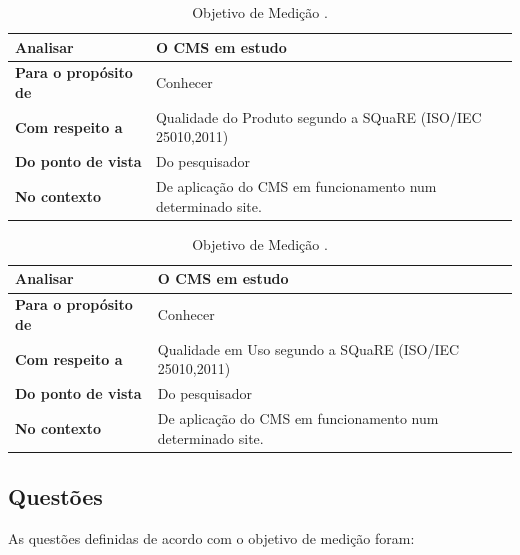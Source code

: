 \begin{longtable}{|p{160pt}|p{265pt}|}
 	\caption{Objetivo de Medição \cite{sollingen}.} \label{ObjMed}\\
 	\hline
 	 {\raggedright \textbf{Analisar}}
 	 & {\raggedright {O CMS em estudo}}\\
 	
 	\hline
 	 {\raggedright \textbf{Para o propósito de}}
 	 & {\raggedright   Conhecer }\\
 	
 	\hline
 	 {\raggedright \textbf{Com respeito a}}
 	 & {\raggedright Qualidade do Produto segundo a SQuaRE (ISO/IEC 25010,2011)}\\
 	
 	\hline
 	 {\raggedright \textbf{Do ponto de vista}} 
 	 & {\raggedright Do pesquisador 	                 } \\

 	\hline
 	 {\raggedright \textbf{No contexto}}
 	 & {\raggedright De aplicação do CMS em funcionamento num determinado site.} \\
 	\hline
\end{longtable}

\begin{longtable}{|p{160pt}|p{265pt}|}
 	\caption{Objetivo de Medição \cite{sollingen}.} \label{ObjMed-2}\\
 	\hline
 	 {\raggedright \textbf{Analisar}}
 	 & {\raggedright {O CMS em estudo}}\\
 	
 	\hline
 	 {\raggedright \textbf{Para o propósito de}}
 	 & {\raggedright   Conhecer }\\
 	
 	\hline
 	 {\raggedright \textbf{Com respeito a}}
 	 & {\raggedright Qualidade em Uso segundo a SQuaRE (ISO/IEC 25010,2011)}\\
 	
 	\hline
 	 {\raggedright \textbf{Do ponto de vista}} 
 	 & {\raggedright Do pesquisador 	                 } \\

 	\hline
 	 {\raggedright \textbf{No contexto}}
 	 & {\raggedright De aplicação do CMS em funcionamento num determinado site.} \\
 	\hline
\end{longtable}

\subsection{Questões}
\label{Questões-GQM}
As questões definidas de acordo com o objetivo de medição foram:

